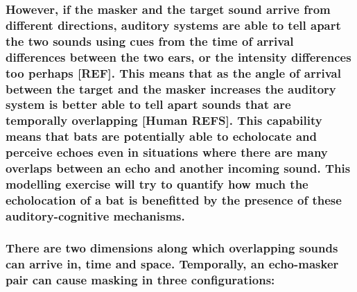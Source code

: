 \documentclass[11pt]{article}
\begin{document}
\hypertarget{however-if-the-masker-and-the-target-sound-arrive-from-different-directions-auditory-systems-are-able-to-tell-apart-the-two-sounds-using-cues-from-the-time-of-arrival-differences-between-the-two-ears-or-the-intensity-differences-too-perhaps-ref.-this-means-that-as-the-angle-of-arrival-between-the-target-and-the-masker-increases-the-auditory-system-is-better-able-to-tell-apart-sounds-that-are-temporally-overlapping-human-refs.-this-capability-means-that-bats-are-potentially-able-to-echolocate-and-perceive-echoes-even-in-situations-where-there-are-many-overlaps-between-an-echo-and-another-incoming-sound.-this-modelling-exercise-will-try-to-quantify-how-much-the-echolocation-of-a-bat-is-benefitted-by-the-presence-of-these-auditory-cognitive-mechanisms.}{%
\subsubsection{However, if the masker and the target sound arrive from
different directions, auditory systems are able to tell apart the two
sounds using cues from the time of arrival differences between the two
ears, or the intensity differences too perhaps {[}REF{]}. This means
that as the angle of arrival between the target and the masker increases
the auditory system is better able to tell apart sounds that are
temporally overlapping {[}Human REFS{]}. This capability means that bats
are potentially able to echolocate and perceive echoes even in
situations where there are many overlaps between an echo and another
incoming sound. This modelling exercise will try to quantify how much
the echolocation of a bat is benefitted by the presence of these
auditory-cognitive
mechanisms.}\label{however-if-the-masker-and-the-target-sound-arrive-from-different-directions-auditory-systems-are-able-to-tell-apart-the-two-sounds-using-cues-from-the-time-of-arrival-differences-between-the-two-ears-or-the-intensity-differences-too-perhaps-ref.-this-means-that-as-the-angle-of-arrival-between-the-target-and-the-masker-increases-the-auditory-system-is-better-able-to-tell-apart-sounds-that-are-temporally-overlapping-human-refs.-this-capability-means-that-bats-are-potentially-able-to-echolocate-and-perceive-echoes-even-in-situations-where-there-are-many-overlaps-between-an-echo-and-another-incoming-sound.-this-modelling-exercise-will-try-to-quantify-how-much-the-echolocation-of-a-bat-is-benefitted-by-the-presence-of-these-auditory-cognitive-mechanisms.}}

\hypertarget{there-are-two-dimensions-along-which-overlapping-sounds-can-arrive-in-time-and-space.-temporally-an-echo-masker-pair-can-cause-masking-in-three-configurations}{%
\subsubsection{There are two dimensions along which overlapping sounds
can arrive in, time and space. Temporally, an echo-masker pair can cause
masking in three
configurations:}\label{there-are-two-dimensions-along-which-overlapping-sounds-can-arrive-in-time-and-space.-temporally-an-echo-masker-pair-can-cause-masking-in-three-configurations}}
\end{document}
